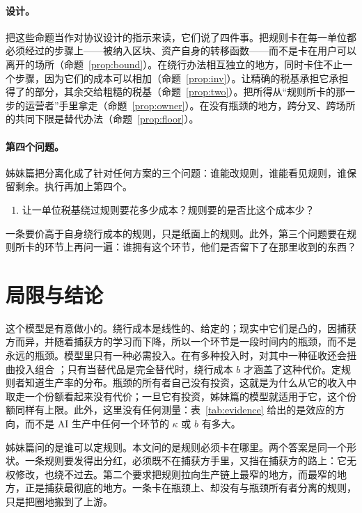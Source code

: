 \paragraph{设计。} 把这些命题当作对协议设计的指示来读，它们说了四件事。把规则卡在每一单位都必须经过的步骤上——被纳入区块、资产自身的转移函数——而不是卡在用户可以离开的场所（命题~\ref{prop:bound}）。在绕行办法相互独立的地方，同时卡住不止一个步骤，因为它们的成本可以相加（命题~\ref{prop:inv}）。让精确的税基承担它承担得了的部分，其余交给粗糙的税基（命题~\ref{prop:two}）。把所得从“规则所卡的那一步的运营者”手里拿走（命题~\ref{prop:owner}）。在没有瓶颈的地方，跨分叉、跨场所的共同下限是替代办法（命题~\ref{prop:floor}）。

\paragraph{第四个问题。} 姊妹篇把分离化成了针对任何方案的三个问题：谁能改规则，谁能看见规则，谁保留剩余。执行再加上第四个。
\begin{enumerate}[label=Q\arabic*.,leftmargin=3em,start=4]
\item 让一单位税基绕过规则要花多少成本？规则要的是否比这个成本少？
\end{enumerate}
一条要价高于自身绕行成本的规则，只是纸面上的规则。此外，第三个问题要在规则所卡的环节上再问一遍：谁拥有这个环节，他们是否留下了在那里收到的东西？

\section{局限与结论}

这个模型是有意做小的。绕行成本是线性的、给定的；现实中它们是凸的，因捕获方而异，并随着捕获方的学习而下降，所以一个环节是一段时间内的瓶颈，而不是永远的瓶颈。模型里只有一种必需投入。在有多种投入时，对其中一种征收还会扭曲投入组合 \citep{DiamondMirrlees1971}；只有当替代品是完全替代时，绕行成本 $b$ 才涵盖了这种代价。定规则者知道生产率的分布。瓶颈的所有者自己没有投资，这就是为什么从它的收入中取走一个份额看起来没有代价；一旦它有投资，姊妹篇的模型就适用于它，这个份额同样有上限。此外，这里没有任何测量：表~\ref{tab:evidence} 给出的是效应的方向，而不是 AI 生产中任何一个环节的 $\kappa$ 或 $b$ 有多大。

姊妹篇问的是谁可以定规则。本文问的是规则必须卡在哪里。两个答案是同一个形状。一条规则要发得出分红，必须既不在捕获方手里，又挡在捕获方的路上：它无权修改，也绕不过去。第二个要求把规则拉向生产链上最窄的地方，而最窄的地方，正是捕获最彻底的地方。一条卡在瓶颈上、却没有与瓶颈所有者分离的规则，只是把圈地搬到了上游。

